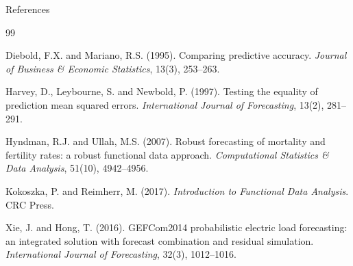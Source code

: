 \documentclass[10pt,aspectratio=169]{beamer}
\begin{document}
\begin{frame}{References}
  \footnotesize
  \begin{thebibliography}{99}

    Diebold, F.X. and Mariano, R.S. (1995).
    Comparing predictive accuracy.
    \textit{Journal of Business \& Economic Statistics}, 13(3), 253--263.

    Harvey, D., Leybourne, S. and Newbold, P. (1997).
    Testing the equality of prediction mean squared errors.
    \textit{International Journal of Forecasting}, 13(2), 281--291.

    Hyndman, R.J. and Ullah, M.S. (2007).
    Robust forecasting of mortality and fertility rates:
    a robust functional data approach.
    \textit{Computational Statistics \& Data Analysis}, 51(10), 4942--4956.

    Kokoszka, P. and Reimherr, M. (2017).
    \textit{Introduction to Functional Data Analysis}. CRC Press.

    Xie, J. and Hong, T. (2016).
    GEFCom2014 probabilistic electric load forecasting:
    an integrated solution with forecast combination and residual simulation.
    \textit{International Journal of Forecasting}, 32(3), 1012--1016.

  \end{thebibliography}
\end{frame}
\end{document}
